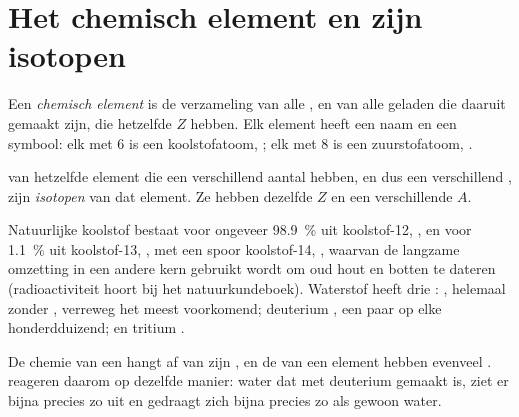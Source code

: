 \section{Het chemisch element en zijn isotopen}

\begin{definition}\label{def:g9:inside-the-atom:element}
Een \emph{chemisch element} is de verzameling
van alle , en van alle geladen  die daaruit gemaakt zijn,
die hetzelfde  $Z$ hebben. Elk element heeft een naam en een
symbool: elk  met 6  is een koolstofatoom, ; elk 
met 8  is een zuurstofatoom, .
\end{definition}

\begin{definition}[Isotopen]\label{def:g9:inside-the-atom:isotope}
 van hetzelfde element die een verschillend aantal 
hebben, en dus een verschillend , zijn
\emph{isotopen} van dat element. Ze hebben dezelfde $Z$
en een verschillende $A$.
\end{definition}

\begin{example}\label{ex:g9:inside-the-atom:isotopes}
Natuurlijke koolstof bestaat voor ongeveer \qty{98.9}{\percent} uit
koolstof-12, , en voor \qty{1.1}{\percent} uit koolstof-13,
, met een spoor koolstof-14, , waarvan de
langzame omzetting in een andere kern gebruikt wordt om oud hout en
botten te dateren (radioactiviteit hoort bij het natuurkundeboek).
Waterstof heeft drie : , helemaal zonder ,
verreweg het meest voorkomend; deuterium , een paar 
op elke honderdduizend; en tritium .
\end{example}

\begin{proposition}\label{prop:g9:inside-the-atom:alike}
De chemie van een  hangt af van zijn , en de  van
een element hebben evenveel .  reageren daarom op
dezelfde manier: water dat met deuterium gemaakt is, ziet er bijna
precies zo uit en gedraagt zich bijna precies zo als gewoon water.
\end{proposition}


